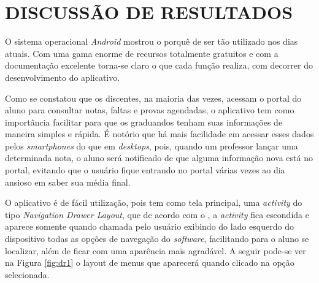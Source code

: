 
\chapter{DISCUSSÃO DE RESULTADOS} 

	\par O sistema operacional \textit{Android} mostrou o porquê de ser tão
utilizado nos dias atuais. Com uma gama enorme de recursos totalmente gratuitos
e com a documentação excelente torna-se claro o que cada função realiza, com
decorrer do desenvolvimento do aplicativo.

	\par Como se constatou que os discentes, na maioria das vezes, acessam o portal
do aluno para consultar notas, faltas e provas agendadas, o aplicativo tem como
importância facilitar para que os graduandos tenham suas informações de maneira
simples e rápida. É notório que há mais facilidade em acessar esses dados pelos
\textit{smartphones} do que em \textit{desktops}, pois, quando um professor
lançar uma determinada nota, o aluno será notificado de que alguma informação
nova está no portal, evitando que o usuário fique entrando no portal várias
vezes ao dia ansioso em saber sua média final.
	
	\par O aplicativo é de fácil utilização, pois tem como tela principal, uma
\textit{activity} do tipo \textit{Navigation Drawer Layout}, que de acordo com
o , a \textit{activity} fica escondida e aparece somente quando
chamada pelo usuário exibindo do lado esquerdo do dispositivo todas as opções
de navegação do \textit{software}, facilitando para o aluno se localizar, além
de ficar com uma aparência mais agradável. A seguir pode-se ver na Figura
\ref{fig:dr1} o layout de menus que aparecerá quando clicado na opção
selecionada.
 

